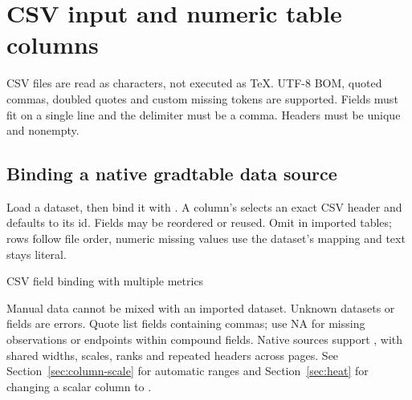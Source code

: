 \section{CSV input and numeric table columns}
\label{sec:csv-input}
CSV files are read as characters, not executed as TeX. UTF-8 BOM, quoted commas,
doubled quotes and custom missing tokens are supported. Fields must fit on a
single line and the delimiter must be a comma. Headers must be unique and nonempty.
\subsection{Binding a native gradtable data source}
\label{sec:csv-native}
Load a dataset, then bind it with . A column's
 selects an exact CSV header and defaults to its id. Fields may
be reordered or reused. Omit  in imported tables; rows follow file order,
numeric missing values use the dataset's mapping and text stays literal.
\begin{demo}{CSV field binding with multiple metrics}
\begin{gradtable}[data=results,width=\linewidth,scale=column,header align=c]
\end{gradtable}
\end{demo}
Manual  data cannot be mixed with an imported dataset. Unknown datasets
or fields are errors. Quote list fields containing commas; use NA for missing
observations or endpoints within compound fields. Native sources support
, with shared widths, scales, ranks and repeated headers across pages.
See Section~\ref{sec:column-scale} for automatic ranges and Section~\ref{sec:heat}
for changing a scalar column to .
